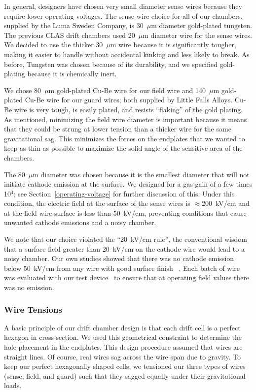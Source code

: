In general, designers have chosen very small diameter sense wires because they
require lower operating voltages.
The sense wire choice for all of our chambers, supplied by the Luma
Sweden Company, is 30~$\mu$m diameter gold-plated tungsten.  
The previous CLAS drift chambers used 20~$\mu$m diameter wire for the
sense wires.  We decided to use the thicker 30~$\mu$m wire because it is 
significantly tougher, making it easier to handle without
accidental kinking and less likely to break.
As before, Tungsten was chosen because of its durability, 
and we specified gold-plating because it is chemically inert.  

We chose 80~$\mu$m gold-plated Cu-Be wire for our field wire and
140~$\mu$m gold-plated Cu-Be wire for our guard wires; both supplied
by Little Falls Alloys. Cu-Be wire is very tough, is easily plated, and resists
``flaking'' of the gold plating. 
As mentioned, minimizing the field wire diameter is important because it means that they 
could be strung at lower tension than a thicker wire for the same gravitational sag.  
This minimizes the forces on the endplates that we wanted to keep as 
thin as possible to maximize the solid-angle of the sensitive area of
the chambers.

The 80~$\mu$m diameter was chosen because it is the smallest diameter
that will not initiate cathode emission at the surface.
We designed for a gas gain of a few times 
10$^4$; see Section~\ref{operating-voltage} for further discussion of this. 
Under this condition, the electric field at the surface of the sense 
wires is $\approx$200~kV/cm and at the field wire
surface is less than 50~kV/cm, preventing 
conditions that cause unwanted cathode emissions and a noisy chamber.  

We note that our choice violated the ``20~kV/cm rule'', the conventional wisdom that
a surface field greater than 20~kV/cm on the cathode wire would lead to 
a noisy chamber. Our own studies showed that there was no cathode emission below
50~kV/cm from any wire with good surface finish~\cite{cathode-emission} .  Each batch
of wire was evaluated with our test device~\cite{patent} to ensure that at operating field 
values there was no emission.  

\subsubsection{Wire Tensions}

A basic principle of our drift chamber design is that each drift cell is a perfect hexagon
in cross-section.
We used this geometrical constraint to determine the hole placement in the endplates.
This design procedure assumed that wires are straight lines.  Of course, real wires
sag across the wire span due to gravity.  To keep our perfect hexagonally shaped cells,
we tensioned our three types of wires (sense, field, and guard) such that they
sagged equally under their gravitational loads.

